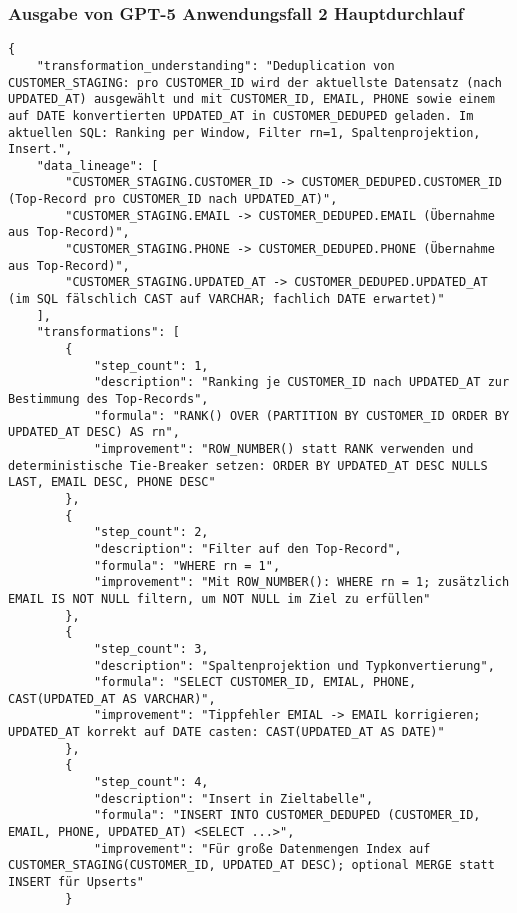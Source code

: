 \subsubsection{Ausgabe von GPT-5 Anwendungsfall 2 Hauptdurchlauf}\label{anhang:subsubsec:gpt_case2_prompt1}
\begin{lstlisting}[caption={Ausgabe: GPT-5 Anwendungsfall 2 Hauptdurchlauf},label={gpt_case2_prompt1}]
{
    "transformation_understanding": "Deduplication von CUSTOMER_STAGING: pro CUSTOMER_ID wird der aktuellste Datensatz (nach UPDATED_AT) ausgewählt und mit CUSTOMER_ID, EMAIL, PHONE sowie einem auf DATE konvertierten UPDATED_AT in CUSTOMER_DEDUPED geladen. Im aktuellen SQL: Ranking per Window, Filter rn=1, Spaltenprojektion, Insert.",
    "data_lineage": [
        "CUSTOMER_STAGING.CUSTOMER_ID -> CUSTOMER_DEDUPED.CUSTOMER_ID (Top-Record pro CUSTOMER_ID nach UPDATED_AT)",
        "CUSTOMER_STAGING.EMAIL -> CUSTOMER_DEDUPED.EMAIL (Übernahme aus Top-Record)",
        "CUSTOMER_STAGING.PHONE -> CUSTOMER_DEDUPED.PHONE (Übernahme aus Top-Record)",
        "CUSTOMER_STAGING.UPDATED_AT -> CUSTOMER_DEDUPED.UPDATED_AT (im SQL fälschlich CAST auf VARCHAR; fachlich DATE erwartet)"
    ],
    "transformations": [
        {
            "step_count": 1,
            "description": "Ranking je CUSTOMER_ID nach UPDATED_AT zur Bestimmung des Top-Records",
            "formula": "RANK() OVER (PARTITION BY CUSTOMER_ID ORDER BY UPDATED_AT DESC) AS rn",
            "improvement": "ROW_NUMBER() statt RANK verwenden und deterministische Tie-Breaker setzen: ORDER BY UPDATED_AT DESC NULLS LAST, EMAIL DESC, PHONE DESC"
        },
        {
            "step_count": 2,
            "description": "Filter auf den Top-Record",
            "formula": "WHERE rn = 1",
            "improvement": "Mit ROW_NUMBER(): WHERE rn = 1; zusätzlich EMAIL IS NOT NULL filtern, um NOT NULL im Ziel zu erfüllen"
        },
        {
            "step_count": 3,
            "description": "Spaltenprojektion und Typkonvertierung",
            "formula": "SELECT CUSTOMER_ID, EMIAL, PHONE, CAST(UPDATED_AT AS VARCHAR)",
            "improvement": "Tippfehler EMIAL -> EMAIL korrigieren; UPDATED_AT korrekt auf DATE casten: CAST(UPDATED_AT AS DATE)"
        },
        {
            "step_count": 4,
            "description": "Insert in Zieltabelle",
            "formula": "INSERT INTO CUSTOMER_DEDUPED (CUSTOMER_ID, EMAIL, PHONE, UPDATED_AT) <SELECT ...>",
            "improvement": "Für große Datenmengen Index auf CUSTOMER_STAGING(CUSTOMER_ID, UPDATED_AT DESC); optional MERGE statt INSERT für Upserts"
        }

\end{lstlisting}

